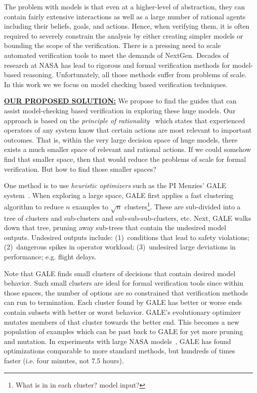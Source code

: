 \documentclass[12pt]{article}
\begin{document}
The problem with models is that even at a higher-level of abstraction, they can contain fairly extensive interactions as well as a large number of rational agents including their beliefs, goals, and actions. Hence, when verifying them, it is often required to severely constrain the analysis by either creating simpler models or bounding the scope of the verification.
There is a pressing need to scale automated verification tools to meet the demands of NextGen. Decades of research at NASA has lead to rigorous and formal verification methods for model-based reasoning. Unfortunately, all those methods suffer from problems of scale. In this work we we focus on model checking based verification techniques.

\noindent
\underline{{\bf OUR PROPOSED SOLUTION:}} We propose to find the guides
that can assist model-checking based verification in exploring these huge models. Our approach is based on the  {\em principle of rationality}~\cite{Newell88} which states that experienced operators of any system know that certain actions are most relevant to important outcomes. That is, within the very large decision space of huge models, there exists a much smaller space of relevant and rational actions. If we could somehow find that smaller space, then that would reduce the problems of scale for formal verification. But how to find those smaller spaces?

One method is to use {\em  heuristic optimizers} such as the PI Menzies' GALE system~\cite{krall2015gale}.  When exploring a large space, GALE first applies a fast clustering algorithm to reduce  $n$ examples to $\sqrt{n}$ clusters\footnote{What is in in each cluster? model input?}.  These are sub-divided into a tree of clusters and sub-clusters and sub-sub-sub-clusters, etc. Next, GALE walks down that tree, pruning away sub-trees that contain the undesired model outputs. Undesired outputs include: (1)~conditions that lead to safety violations; (2)~dangerous spikes in operator workload; (3)~undesired large deviations in performance; e.g. flight delays. 

Note that GALE finds small clusters of decisions that contain desired model 
behavior. Such small clusters are ideal for formal verification tools since
within those spaces, the number of options are so constrained that verification
methods can run to termination. 
Each cluster found by GALE has better or worse ends
contain subsets with better or worst behavior. GALE's evolutionary optimizer
mutates members of that cluster towards the better end. This becomes a new population of examples which can be past back to GALE for yet more pruning and
 mutation. In experiments with large NASA models~\cite{me15z}, GALE has found optimizations comparable to more standard methods, but hundreds of times faster (i.e. four minutes, not 7.5 hours).
\end{document}
